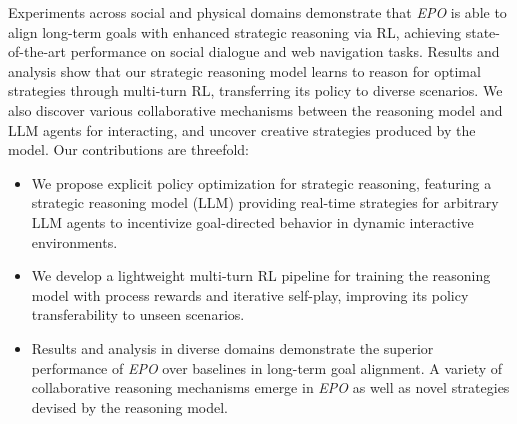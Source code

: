 Experiments across social and physical domains demonstrate that \textit{EPO} is able to align long-term goals with enhanced strategic reasoning via RL, achieving state-of-the-art performance on social dialogue and web navigation tasks.
Results and analysis show that our strategic reasoning model learns to reason for optimal strategies through multi-turn RL, transferring its policy to diverse scenarios. 
We also discover various collaborative mechanisms between the reasoning model and LLM agents for interacting, and uncover creative strategies produced by the model.
Our contributions are threefold:
\begin{itemize}
    \item We propose explicit policy optimization for strategic reasoning, featuring a strategic reasoning model (LLM) providing real-time strategies for arbitrary LLM agents to incentivize goal-directed behavior in dynamic interactive environments.
    \item We develop a lightweight multi-turn RL pipeline for training the reasoning model with process rewards and iterative self-play, improving its policy transferability to unseen scenarios.
    \item Results and analysis in diverse domains demonstrate the superior performance of \textit{EPO} over baselines in long-term goal alignment.
    A variety of collaborative reasoning mechanisms emerge in \textit{EPO} as well as novel strategies devised by the reasoning model.
\end{itemize}












